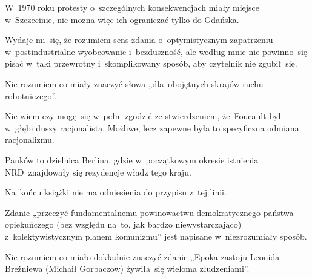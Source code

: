 \documentclass[a4paper,11pt]{article}
\numberwithin{equation}{section}
\begin{document}
\noindent
{} W~1970 roku protesty o~szczególnych konsekwencjach
miały miejsce w~Szczecinie, nie można więc ich ograniczać tylko do Gdańska.

\VerSpaceFour





\noindent
{} Wydaje mi~się, że rozumiem sens zdania
o~optymistycznym zapatrzeniu w~postindustrialne wyobcowanie i~bezduszność,
ale według mnie nie powinno~się pisać w~taki przewrotny i~skomplikowany
sposób, aby czytelnik nie zgubił~się.

\VerSpaceFour





\noindent
{} Nie rozumiem co miały znaczyć słowa „dla~obojętnych
skrajów ruchu robotniczego”.

\VerSpaceFour





\noindent
{} Nie wiem czy mogę~się w~pełni zgodzić ze stwierdzeniem,
że~Foucault był w~głębi duszy racjonalistą. Możliwe, lecz zapewne była to
specyficzna odmiana racjonalizmu.

\VerSpaceFour





\noindent
{} Panków to dzielnica Berlina, gdzie w~początkowym
okresie istnienia NRD~znajdowały się rezydencje władz tego kraju.

\VerSpaceFour





\noindent
{} Na~końcu książki nie ma odniesienia do przypisu
z~tej linii.

\VerSpaceFour





\noindent
{} Zdanie „przeczyć fundamentalnemu powinowactwu
demokratycznego państwa opiekuńczego (bez względu na~to, jak bardzo
niewystarczająco) z~kolektywistycznym planem komunizmu” jest napisane
w~niezrozumiały sposób.

\VerSpaceFour





\noindent
{} Nie rozumiem co miało dokładnie znaczyć zdanie
„Epoka zastoju Leonida Breżniewa (Michaił Gorbaczow) żywiła~się wieloma
złudzeniami”.
\end{document}
